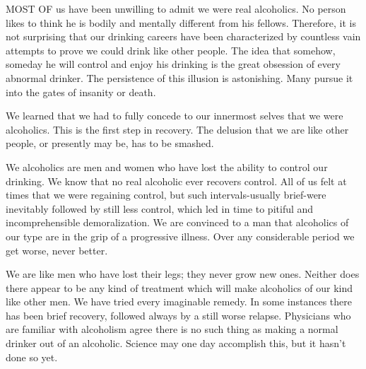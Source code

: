 

\bbChapterPreamble


\begin{biblechapter}
    MOST OF us have been unwilling to admit we were real alcoholics. 
\verse No person likes to think he is bodily and mentally 
    different from his fellows.  
\verse Therefore, it is not surprising that our drinking careers 
    have been characterized by countless vain attempts 
    to prove we could drink like other people.  
\verse The idea that somehow, someday 
    he will control and enjoy his drinking 
    is the great obsession of every abnormal drinker.  
\verse The persistence of this illusion is astonishing.  
\verse Many pursue it into the gates of insanity or death.

\verse We learned that we had to fully concede to our innermost selves 
    that we were alcoholics. 
\verse This is the first step in recovery. 
\verse The delusion that we are like other people, 
    or presently may be, has to be smashed.
\end{biblechapter}


\begin{biblechapter}
    We alcoholics are men and women 
    who have lost the ability to control our drinking. 
\verse We know that no real alcoholic ever recovers control. 
\verse All of us felt at times that we were regaining control, 
    but such intervals-usually brief-were inevitably followed 
    by still less control, 
    which led in time to pitiful and incomprehensible demoralization. 
\verse We are convinced to a man that alcoholics of our type 
    are in the grip of a progressive illness. 
\verse Over any considerable period we get worse, never better.

\verse We are like men who have lost their legs; they never grow new ones. 
\verse Neither does there appear to be any kind of treatment which will make alcoholics of our kind like other men. 
\verse We have tried every imaginable remedy. 
\verse In some instances there has been brief recovery, followed always by a still worse relapse. 
\verse Physicians who are familiar with alcoholism 
    agree there is no such thing as making 
    a normal drinker out of an alcoholic. 
\verse Science may one day accomplish this, but it hasn't done so yet.
\end{biblechapter}


